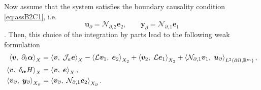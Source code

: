 Now assume that the system satisfies the boundary causality condition \eqref{eq:assB2C1}, i.e.  
\begin{equation*}
	\bm{u}_\partial=\mathcal{N}_{\partial, 2} \bm{e}_2, \qquad \bm{y}_\partial=\mathcal{N}_{\partial, 1} \bm{e}_1
\end{equation*}. 
Then, this choice of the integration by parts lead to the following weak formulation
\begin{equation}\label{eq:weak_sys_intJ1}
	\begin{aligned}
	\inner[X]{\bm{v}}{\partial_t \bm{\alpha}} &=  \inner[X]{\bm{v}}{\mathcal{J}_a\bm{e}} -\inner[X_2]{\mathcal{L}\bm{v}_1}{\bm{e}_2} + \inner[X_2]{\bm{v}_2}{\mathcal{L}\bm{e}_1} + \inner[L^2(\partial \Omega, \mathbb{R}^m)]{\mathcal{N}_{\partial, 1} \bm{v}_1}{\bm{u}_\partial}, \\
	\inner[X]{\bm{v}}{\delta_{\bm{\alpha}} H} &= \inner[X]{\bm{v}}{\bm{e}}, \\
	\inner[X_\partial]{\bm{v}_\partial}{\bm{y}_\partial} &= \inner[X_\partial]{\bm{v}_\partial}{\mathcal{N}_{\partial, 1}\bm{e}_2}.
	\end{aligned}
\end{equation}

